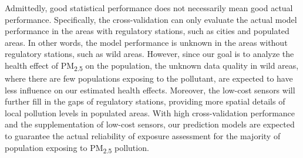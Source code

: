 \documentclass[11pt]{article}
\newcommand{\tsub}{\textsubscript}
\begin{document}
\begin{itemize*}
    \item Admittedly, good statistical performance does not necessarily mean good actual performance. Specifically, the cross-validation can only evaluate the actual model performance in the areas with regulatory stations, such as cities and populated areas. In other words, the model performance is unknown in the areas without regulatory stations, such as wild areas. However, since our goal is to analyze the health effect of PM\tsub{2.5} on the population, the unknown data quality in wild areas, where there are few populations exposing to the pollutant, are expected to have less influence on our estimated health effects. Moreover, the low-cost sensors will further fill in the gaps of regulatory stations, providing more spatial details of local pollution levels in populated areas. With high cross-validation performance and the supplementation of low-cost sensors, our prediction models are expected to guarantee the actual reliability of exposure assessment for the majority of population exposing to PM\tsub{2.5} pollution. 
\end{itemize*}
\end{document}
